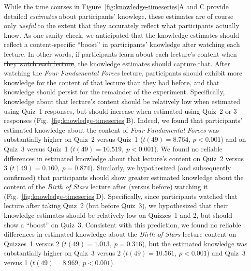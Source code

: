 \documentclass[10pt]{article}
\providecommand{\DIFaddtex}[1]{{\protect\color{blue}\uwave{#1}}} %
\providecommand{\DIFdeltex}[1]{{\protect\color{red}\sout{#1}}}                      %
\providecommand{\DIFaddbegin}{} %
\providecommand{\DIFaddend}{} %
\providecommand{\DIFdelbegin}{} %
\providecommand{\DIFdelend}{} %
\providecommand{\DIFadd}[1]{\texorpdfstring{\DIFaddtex{#1}}{#1}} %
\providecommand{\DIFdel}[1]{\texorpdfstring{\DIFdeltex{#1}}{}} %
\newcommand{\DIFscaledelfig}{0.5}
\newlength{\DIFdelgraphicswidth} %
\newlength{\DIFdelgraphicsheight} %
\newcommand{\DIFaddincludegraphics}[2][]{{\color{blue}\fbox{\DIFOincludegraphics[#1]{#2}}}} %
\newcommand{\DIFdelincludegraphics}[2][]{%
\sbox{\DIFdelgraphicsbox}{\DIFOincludegraphics[#1]{#2}}%
\settoboxwidth{\DIFdelgraphicswidth}{\DIFdelgraphicsbox} %
\settoboxtotalheight{\DIFdelgraphicsheight}{\DIFdelgraphicsbox} %
\scalebox{\DIFscaledelfig}{%
\parbox[b]{\DIFdelgraphicswidth}{\usebox{\DIFdelgraphicsbox}\\[-\baselineskip] \rule{\DIFdelgraphicswidth}{0em}}\llap{\resizebox{\DIFdelgraphicswidth}{\DIFdelgraphicsheight}{%
\setlength{\unitlength}{\DIFdelgraphicswidth}%
\begin{picture}(1,1)%
\thicklines\linethickness{2pt} %
{\color[rgb]{1,0,0}\put(0,0){\framebox(1,1){}}}%
{\color[rgb]{1,0,0}\put(0,0){\line( 1,1){1}}}%
{\color[rgb]{1,0,0}\put(0,1){\line(1,-1){1}}}%
\end{picture}%
}\hspace*{3pt}}} %
} %
\DeclareRobustCommand{\DIFaddbegin}{\DIFOaddbegin \let\includegraphics\DIFaddincludegraphics} %
\DeclareRobustCommand{\DIFaddend}{\DIFOaddend \let\includegraphics\DIFOincludegraphics} %
\DeclareRobustCommand{\DIFdelbegin}{\DIFOdelbegin \let\includegraphics\DIFdelincludegraphics} %
\DeclareRobustCommand{\DIFdelend}{\DIFOaddend \let\includegraphics\DIFOincludegraphics} %
\begin{document}
While the time courses in Figure~\ref{fig:knowledge-timeseries}A and C provide
detailed \textit{estimates} about participants' knowlege, these estimates are
of course only \textit{useful} to the extent that they accurately reflect what
participants actually know. As one sanity check, we anticipated that the
knowledge estimates should reflect a content-specific ``boost'' in
participants' knowledge after watching each lecture. In other words, if
participants learn about each lecture's content \DIFdelbegin \DIFdel{when they watch each lecture}\DIFdelend \DIFaddbegin \DIFadd{upon watching it}\DIFaddend ,
the knowledge estimates should capture that. After watching the \textit{Four
Fundamental Forces} lecture, participants should exhibit more knowledge for the
content of that lecture than they had before, and that knowledge should persist
for the remainder of the experiment. Specifically, knowledge about that
lecture's content should be relatively low when estimated using Quiz~1
responses, but should increase when estimated using Quiz~2 or 3 responses
(Fig.~\ref{fig:knowledge-timeseries}B). Indeed, we found that participants'
estimated knowledge about the content of \textit{Four Fundamental Forces}
was substantially higher on Quiz~2 versus Quiz~1 ($t(49) = 8.764,~p < 0.001$)
and on Quiz~3 versus Quiz~1 ($t(49) = 10.519,~p < 0.001$). We found no reliable
differences in estimated knowledge about that lecture's content on Quiz~2
versus 3 ($t(49) = 0.160,~p = 0.874$). Similarly, we hypothesized (and
subsequently confirmed) that participants should show greater estimated
knowledge about the content of the \textit{Birth of Stars} lecture after
(versus before) watching it (Fig.~\ref{fig:knowledge-timeseries}D).
Specifically, since participants watched that lecture after taking Quiz~2 (but
before Quiz~3), we hypothesized that their knowledge estimates should be
relatively low on Quizzes~1 and 2, but should show a ``boost'' on Quiz~3.
Consistent with this prediction, we found no reliable differences in estimated
knowledge about the \textit{Birth of Stars} lecture content on Quizzes~1 versus
2 ($t(49) = 1.013,~p = 0.316$), but the estimated knowledge was substantially
higher on Quiz~3 versus 2 ($t(49) = 10.561,~p < 0.001$) and Quiz~3 versus 1
($t(49) = 8.969,~p < 0.001$).
\end{document}
